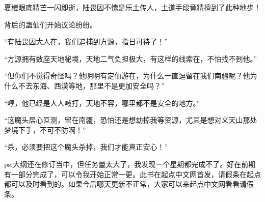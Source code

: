 \begin{this_body}
夏槎眼底精芒一闪即逝，陆畏因不愧是乐土传人，土道手段竟精擅到了此种地步！

背后的蛊仙们开始议论纷纷。

“有陆畏因大人在，我们追捕到方源，指日可待了！”

“方源拥有数座天地秘境，天地二气负担极大，有这样的线索在，不怕找不到他。”

“但你们不觉得奇怪吗？他明明有定仙游在，为什么一直逗留在我们南疆呢？他为什么不去东海、西漠等地，那里不是更加安全吗？”

“哼，他已经是人人喊打，天地不容，哪里都不是安全的地方。”

“这魔头居心叵测，留在南疆，恐怕还是想劫掠我等资源，尤其是想对义天山那处梦境下手，不可不防啊！”

“杀，必须要把这个魔头杀掉，我们才能真正安心！”

ps:大纲还在修订当中，但任务量太大了，我发现一个星期都完成不了。好在前期有一部分完成了，可以令我开始正常一更。此书在起点中文网首发，请假条在起点都可以及时看到的。如果今后哪天更新不正常，大家可以来起点中文网看看请假条。

\end{this_body}

